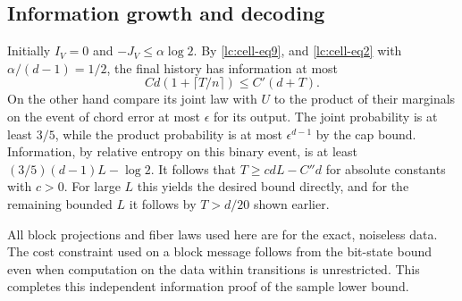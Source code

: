 \subsection{Information growth and decoding}\label{lc:cell-endgame}

Initially \(I_V=0\) and \(-J_V\le \alpha\log 2\). By \eqref{lc:cell-eq9}, and \eqref{lc:cell-eq2} with \(\alpha/(d-1)=1/2\), the final history has information at most
\[
 C d(1+\lceil T/n\rceil)\le C'(d+T).
\]
On the other hand compare its joint law with \(U\) to the product of their marginals on the event of chord error at most \(\epsilon\) for its output. The joint probability is at least \(3/5\), while the product probability is at most \(\epsilon^{d-1}\) by the cap bound. Information, by relative entropy on this binary event, is at least \((3/5)(d-1)L-\log 2\). It follows that \(T\ge c dL-C''d\) for absolute constants with \(c>0\). For large \(L\) this yields the desired bound directly, and for the remaining bounded \(L\) it follows by \(T>d/20\) shown earlier.

All block projections and fiber laws used here are for the exact, noiseless data. The cost constraint used on a block message follows from the bit-state bound even when computation on the data within transitions is unrestricted. This completes this independent information proof of the sample lower bound.
